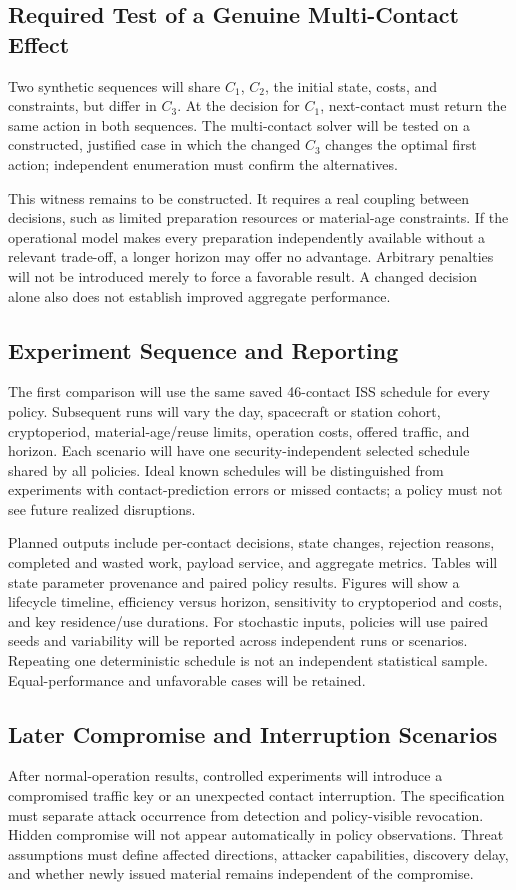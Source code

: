 \documentclass[conference]{IEEEtran}
\begin{document}
\subsection{Required Test of a Genuine Multi-Contact Effect}
Two synthetic sequences will share $C_1$, $C_2$, the initial state, costs, and constraints, but differ in $C_3$. At the decision for $C_1$, next-contact must return the same action in both sequences. The multi-contact solver will be tested on a constructed, justified case in which the changed $C_3$ changes the optimal first action; independent enumeration must confirm the alternatives.

This witness remains to be constructed. It requires a real coupling between decisions, such as limited preparation resources or material-age constraints. If the operational model makes every preparation independently available without a relevant trade-off, a longer horizon may offer no advantage. Arbitrary penalties will not be introduced merely to force a favorable result. A changed decision alone also does not establish improved aggregate performance.

\subsection{Experiment Sequence and Reporting}
The first comparison will use the same saved 46-contact ISS schedule for every policy. Subsequent runs will vary the day, spacecraft or station cohort, cryptoperiod, material-age/reuse limits, operation costs, offered traffic, and horizon. Each scenario will have one security-independent selected schedule shared by all policies. Ideal known schedules will be distinguished from experiments with contact-prediction errors or missed contacts; a policy must not see future realized disruptions.

Planned outputs include per-contact decisions, state changes, rejection reasons, completed and wasted work, payload service, and aggregate metrics. Tables will state parameter provenance and paired policy results. Figures will show a lifecycle timeline, efficiency versus horizon, sensitivity to cryptoperiod and costs, and key residence/use durations. For stochastic inputs, policies will use paired seeds and variability will be reported across independent runs or scenarios. Repeating one deterministic schedule is not an independent statistical sample. Equal-performance and unfavorable cases will be retained.

\subsection{Later Compromise and Interruption Scenarios}
After normal-operation results, controlled experiments will introduce a compromised traffic key or an unexpected contact interruption. The specification must separate attack occurrence from detection and policy-visible revocation. Hidden compromise will not appear automatically in policy observations. Threat assumptions must define affected directions, attacker capabilities, discovery delay, and whether newly issued material remains independent of the compromise.
\end{document}
